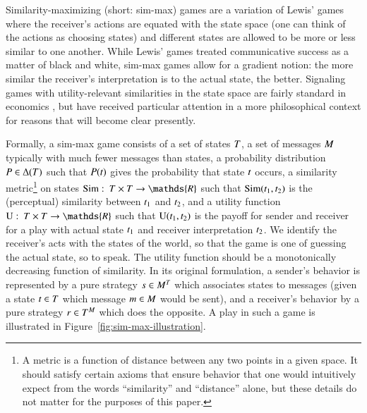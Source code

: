 \documentclass[fleqn,reqno,10pt]{article}
\newcommand{\similarity}{\ensuremath{\mathrm{Sim}}} %
\renewcommand{\Pr}{\ensuremath{P}}
\begin{document}
Similarity-maximizing (short: sim-max) games are a variation of
Lewis' games where the receiver's actions are equated with the state
space (one can think of the actions as choosing states) and different states are allowed to be more or less
similar to one another. While Lewis' games treated communicative
success as a matter of black and white, sim-max games allow for a
gradient notion: the more similar the receiver's interpretation is to
the actual state, the better. Signaling games with utility-relevant
similarities in the state space are fairly standard in economics
\citep[e.g.][]{Spence1973:Job-market-sign,CrawfordSobel1982:Strategic-Infor},
but have received particular attention in a more philosophical context
for reasons that will become clear presently.

Formally, a sim-max game consists of a set of states $T$, a set of messages $M$ typically with much
fewer messages than states, a probability distribution $\Pr \in \Delta(\States)$ such that
$\Pr(\state)$ gives the probability that state $t$ occurs, a similarity metric\footnote{A
  metric is a function of distance between any two points in a given space. It should satisfy
  certain axioms that ensure behavior that one would intuitively expect from the words
  ``similarity'' and ``distance'' alone, but these details do not matter for the purposes of
  this paper.}
on states $\similarity \mycolon \States \times \States \rightarrow \mathds{R}$ such that
$\similarity(\mystate{1}, \mystate{2})$ is the (perceptual) similarity between $t_{\mathrm{1}}$
and $t_{\mathrm{2}}$, and a utility function $\Utils \mycolon \States \times \States \rightarrow
\mathds{R}$ such that $\mathrm{U}(t_{\mathrm{1}}, t_{\mathrm{2}})$ is the payoff for sender and receiver
for a play with actual state $t_{\mathrm{1}}$ and receiver interpretation $t_{\mathrm{2}}$. We
identify the receiver's acts with the states of the world, so that the game is one of guessing
the actual state, so to speak. The utility function should be a monotonically decreasing
function of similarity.
In its original formulation, a sender's behavior is represented by a pure strategy $s \in M^T$ which associates states to messages (given a state $t \in T$ which message $m \in M$ would be sent), and a receiver's behavior by a pure strategy $r \in T^M$ which does the opposite.
A play in such a game is illustrated in Figure~\ref{fig:sim-max-illustration}.
\end{document}
